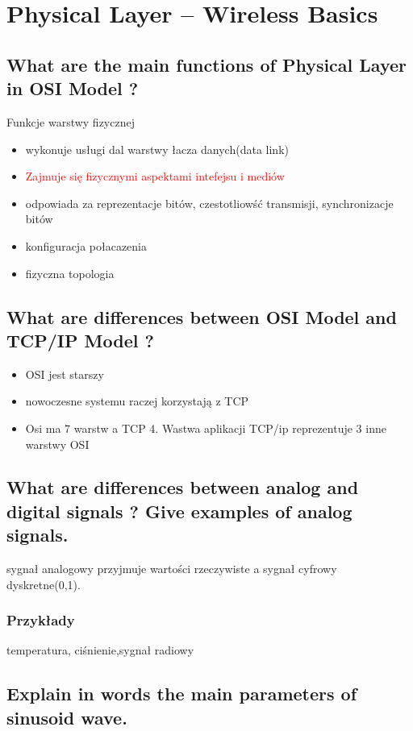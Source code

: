 \section{Physical Layer – Wireless Basics}

\subsection{What are the main functions of Physical Layer in OSI Model ?}

Funkcje warstwy fizycznej
\begin{itemize}
\item wykonuje usługi dal warstwy łacza danych(data link)
\item \textcolor{red}{Zajmuje się fizycznymi aspektami intefejsu i mediów}
\item odpowiada za reprezentacje bitów, czestotliowść transmisji, synchronizacje bitów
\item konfiguracja połacazenia
\item fizyczna topologia 
\end{itemize}

\subsection{What are differences between OSI Model and TCP/IP Model ?}
\begin{itemize}
\item OSI jest starszy
\item nowoczesne systemu raczej korzystają z TCP
\item Osi ma 7 warstw a TCP  4. Wastwa aplikacji TCP/ip reprezentuje 3 inne warstwy OSI

\end{itemize}
\subsection{What are differences between analog and digital signals ? Give examples of analog signals.}
sygnał analogowy przyjmuje wartości rzeczywiste a sygnał cyfrowy dyskretne(0,1).
\subsubsection{Przykłady}
temperatura, ciśnienie,sygnał radiowy
\subsection{Explain in words the main parameters of sinusoid wave.}
